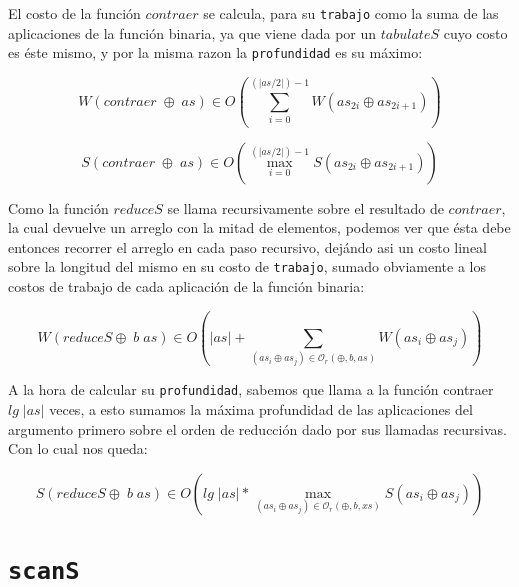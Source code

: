 \documentclass[a4paper,10pt]{article}
\begin{document}
    El costo de la función $contraer$ se calcula, para su \texttt{trabajo} como
la suma de las aplicaciones de la función binaria, ya que viene dada por un $tabulateS$
cuyo costo es éste mismo, y por la misma razon la \texttt{profundidad} es su
máximo:

\begin{equation*}
    W \left( contraer \;\oplus \;as \right) \in
    O \left( \sum_{i=0}^{(\vert as / 2 \vert) - 1} W \left( as_{2i} \oplus as_{2i+1} \right) \right)
\end{equation*}

\begin{equation*}
    S \left( contraer \;\oplus \;as \right) \in
    O \left( \max_{i=0}^{(\vert as / 2 \vert) - 1} S \left( as_{2i} \oplus as_{2i+1} \right) \right)
\end{equation*}

\bigskip

    Como la función $reduceS$ se llama recursivamente sobre el resultado de $contraer$,
la cual devuelve un arreglo con la mitad de elementos, podemos ver que ésta debe
entonces recorrer el arreglo en cada paso recursivo, dejándo asi un costo lineal sobre
la longitud del mismo en su costo de \texttt{trabajo}, sumado obviamente a los costos
de trabajo de cada aplicación de la función binaria:

\begin{equation*}
    W \left( reduceS \oplus \; b \; as \right) \in
    O \left( \vert as \vert + \sum_{(as_i \oplus as_j) \in \mathcal{O}_r(\oplus,b,as)} W \left( as_i \oplus as_j \right) \right)
\end{equation*}

\bigskip
    A la hora de calcular su \texttt{profundidad}, sabemos que llama a la función
contraer $lg \;\vert as \vert$ veces, a esto sumamos la máxima profundidad de las 
aplicaciones del argumento primero sobre el orden de reducción dado por sus 
llamadas recursivas. Con lo cual nos queda:

\begin{equation*}
    S \left( reduceS \oplus \; b \; as \right) \in
    O \left( lg \; \vert as \vert * \max_{(as_i \oplus as_j) \in \mathcal{O}_r(\oplus,b,xs)} S \left( as_i \oplus as_j \right) \right)
\end{equation*}


\bigskip


\section*{\texttt{scanS}}
\end{document}
